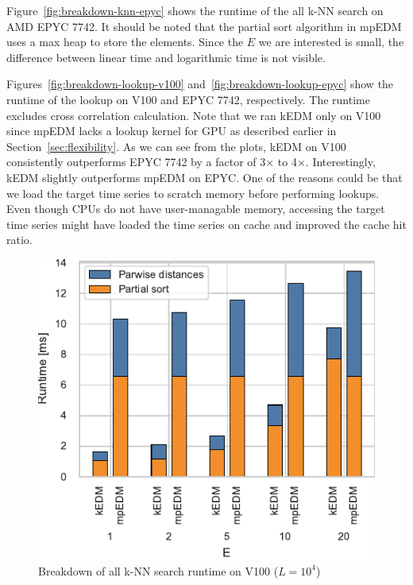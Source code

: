 \documentclass[sigconf]{acmart}
\begin{document}
Figure~\ref{fig:breakdown-knn-epyc} shows the runtime of the all k-NN search
on AMD EPYC 7742. It should be noted that the partial sort algorithm in mpEDM
uses a max heap to store the elements. Since the $E$ we are interested is
small, the difference between linear time and logarithmic time is not visible.


Figures~\ref{fig:breakdown-lookup-v100} and~\ref{fig:breakdown-lookup-epyc}
show the runtime of the lookup on V100 and EPYC 7742, respectively. The runtime
excludes cross correlation calculation. Note that we ran kEDM only on
V100 since mpEDM lacks a lookup kernel for GPU as described earlier in
Section~\ref{sec:flexibility}. As we can see from the plots, kEDM on V100
consistently outperforms EPYC 7742 by a factor of 3$\times$ to 4$\times$.
Interestingly, kEDM slightly outperforms mpEDM on EPYC. One of the reasons could
be that we load the target time series to scratch memory before performing
lookups. Even though CPUs do not have user-managable memory, accessing the
target time series might have loaded the time series on cache and improved the
cache hit ratio.

\begin{figure}
    \centering
    \includegraphics{figs/breakdown_knn_v100}
    \caption{Breakdown of all k-NN search runtime on V100 ($L=10^4$)}%
    \label{fig:breakdown-knn-v100}
\end{figure}
\end{document}
